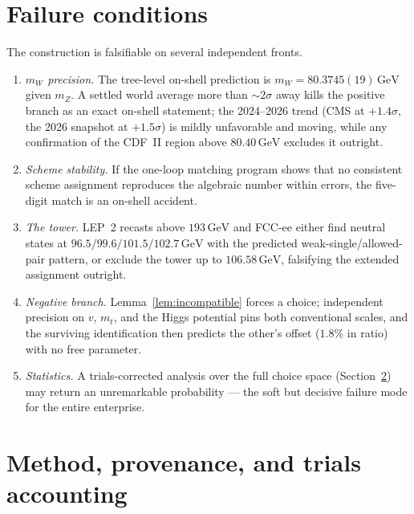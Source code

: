 \documentclass[11pt,a4paper]{article}
\theoremstyle{definition}
\newcommand{\GeV}{\,\mathrm{GeV}}
\begin{document}
\section{Failure conditions}
\label{sec:falsification}

The construction is falsifiable on several independent fronts.
\begin{enumerate}
\item \emph{$m_W$ precision.} The tree-level on-shell prediction is
$m_W=80.3745(19)\GeV$ given $m_Z$. A settled world average more than
${\sim}2\sigma$ away kills the positive branch as an exact on-shell
statement; the 2024--2026 trend (CMS at $+1.4\sigma$, the 2026 snapshot at
$+1.5\sigma$) is mildly unfavorable and moving, while any confirmation of
the CDF~II region above $80.40\GeV$ excludes it outright.
\item \emph{Scheme stability.} If the one-loop matching program shows that
no consistent scheme assignment reproduces the algebraic number within
errors, the five-digit match is an on-shell accident.
\item \emph{The tower.} LEP~2 recasts above $193\GeV$ and FCC-ee either
find neutral states at $96.5/99.6/101.5/102.7\GeV$ with the predicted
weak-single/allowed-pair pattern, or exclude the tower up to
$106.58\GeV$, falsifying the extended assignment outright.
\item \emph{Negative branch.} Lemma~\ref{lem:incompatible} forces a
choice; independent precision on $v$, $m_t$, and the Higgs potential pins
both conventional scales, and the surviving identification then predicts
the other's offset ($1.8\%$ in ratio) with no free parameter.
\item \emph{Statistics.} A trials-corrected analysis over the full choice
space (Section~\ref{sec:provenance}) may return an unremarkable
probability --- the soft but decisive failure mode for the entire
enterprise.
\end{enumerate}

\section{Method, provenance, and trials accounting}
\label{sec:provenance}
\end{document}
